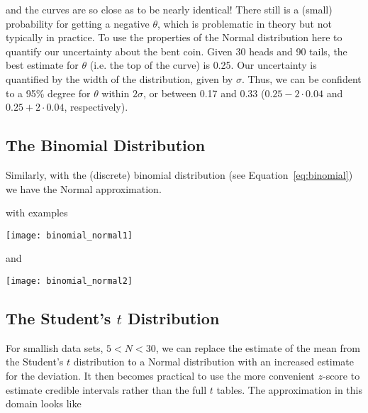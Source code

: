 and the curves are so close as to be nearly identical!  There still is a (small) probability for getting a negative $\theta$, which is problematic in theory but not typically in practice.  To use the properties of the Normal distribution here to quantify our uncertainty about the bent coin.  Given 30 heads and 90 tails, the best estimate for $\theta$ (i.e. the top of the curve) is 0.25.  Our uncertainty is quantified by the width of the distribution, given by $\sigma$.  Thus, we can be confident to a 95\% degree for $\theta$ within $2\sigma$, or between 0.17 and 0.33 ($0.25-2\cdot 0.04$ and $0.25+2\cdot 0.04$, respectively).


\subsection{The Binomial Distribution}

Similarly, with the (discrete) binomial distribution (see Equation~\ref{eq:binomial}) we have the Normal approximation.


with examples

\texttt{[image: binomial\_normal1]}

and

\texttt{[image: binomial\_normal2]}

\subsection{The Student's $t$ Distribution}\label{sec:normal_t_approx}

For smallish data sets, $5<N<30$, we can replace the estimate of the mean from the Student's $t$ distribution to a Normal distribution with an increased estimate for the deviation.  It then becomes practical to use the more convenient $z$-score to estimate credible intervals rather than the full $t$ tables.  The approximation in this domain looks like\cite{berry1996statistics}

